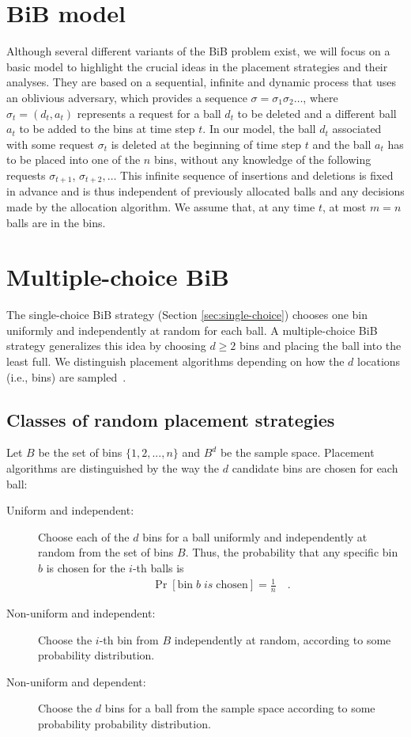 \documentclass[a4paper,12pt]{article}
\begin{document}
\section{BiB model}
\label{sec:model}
Although several different variants of the BiB problem exist, we will focus on a basic model to highlight the crucial ideas in the placement strategies and their analyses. They are based on a sequential, infinite and dynamic process that uses an oblivious adversary, which provides a sequence $\sigma = \sigma_1 \sigma_2 \dots$, where $\sigma_t = (d_t, a_t)$ represents a request for a ball $d_t$ to be deleted and a different ball $a_t$ to be added to the bins at time step $t$. In our model, the ball $d_t$ associated with some request $\sigma_t$ is deleted at the beginning of time step $t$ and the ball $a_t$ has to be placed into one of the $n$ bins, without any knowledge of the following requests $\sigma_{t+1}$, $\sigma_{t+2},\dots$ This infinite sequence of insertions and deletions is fixed in advance and is thus independent of previously allocated balls and any decisions made by the allocation algorithm. We assume that, at any time $t$, at most $m = n$ balls are in the bins.

\section{Multiple-choice BiB}
\label{sec:multiple-choice}
The single-choice BiB strategy (Section \ref{sec:single-choice}) chooses one bin uniformly and independently at random for each ball. A multiple-choice BiB strategy generalizes this idea by  choosing $d \geq 2$ bins and placing the ball into the least full. We distinguish placement algorithms depending on how the $d$ locations (i.e., bins) are sampled~\cite{VOC03}. 

\subsection{Classes of random placement strategies}
\label{sec:classesOfPlacement}
Let $B$ be the set of bins $\{1,2,...,n\}$ and $B^{d}$ be the sample space. Placement algorithms are distinguished by the way the $d$ candidate bins are chosen for each ball:
\begin{description}
\item [Uniform and independent:] Choose each of the $d$ bins for a ball uniformly and independently at random from the set of bins $B$. Thus, the probability that any specific bin $b$ is chosen for the $i$-th balls is
\begin{align*}
\Pr[\mathrm{bin}\;b\;is\;\mathrm{chosen}] = \frac{1}{n} \quad .
\end{align*}
\item [Non-uniform and independent:] Choose the $i$-th bin from $B$ independently at random, according to some probability distribution.
\item [Non-uniform and dependent:] Choose the $d$ bins for a ball from the sample space according to some probability probability distribution.
\end{description}
 
\end{document}
